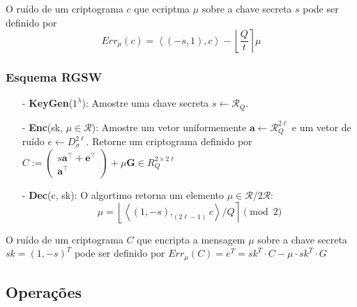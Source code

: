 O ruído de um criptograma $c$ que ecriptma $\mu$ sobre a chave secreta $s$ pode ser definido por 
$$Err_\mu(c) = \left\langle (-s,1), c \right\rangle- \left\lfloor \frac{Q}{t} \right\rceil \mu$$

\subsubsection{Esquema RGSW}

\begin{itemize}[itemsep=0pt, parsep=0pt]
    \item[-] \textbf{KeyGen}($1^{\lambda}$): Amostre uma chave secreta $s \leftarrow \mathcal{R}_Q$.
    \item[-] \textbf{Enc}(sk, $\mu \in \mathcal{R}$): Amostre um vetor uniformemente $\mathbf{a} \leftarrow \mathcal{R}_Q^{2\ell}$ e um vetor de ruído $e \leftarrow D_{\sigma}^{2\ell}$. Retorne um 
    criptograma definido por $C := \begin{pmatrix} s \mathbf{a}^\top + \mathbf{e}^\top \\ \mathbf{a}^\top \end{pmatrix} + \mu \mathbf{G} \in R_Q^{2 \times 2\ell}$
    \item[-] \textbf{Dec}(c, sk): O algortimo retorna um elemento $\mu \in \mathcal{R}/2\mathcal{R}$:
    $$ 
    \mu = \left\lfloor \left\langle (1,-s),_{(2\ell -1)}c \right\rangle/Q \right\rceil  \pmod{2}  
    $$
    
\end{itemize}

O ruído de um criptograma $C$ que encripta a mensagem $\mu$ sobre a chave secreta $sk = (1, -s)^T$ pode ser
definido por $Err_\mu(C) = e^T = sk^T \cdot C - \mu \cdot sk^T \cdot G$ 

\subsection{Operações}

